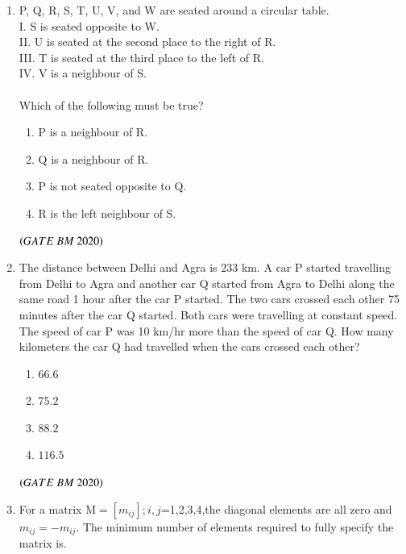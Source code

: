 \documentclass[journal,12pt,onecolumn]{IEEEtran}
\theoremstyle{remark}
\begin{document}
\begin{enumerate}
\item P, Q, R, S, T, U, V, and W are seated around a circular table.\\
      I. S is seated opposite to W.\\
      II. U is seated at the second place to the right of R.\\
      III. T is seated at the third place to the left of R.\\
      IV. V is a neighbour of S.\\
  \\Which of the following must be true?
\begin{enumerate}
    \item \hspace{0.5cm}P is a neighbour of R.
    \item \hspace{0.5cm}Q is a neighbour of R.
    \item \hspace{0.5cm}P is not seated opposite to Q.
    \item \hspace{0.5cm}R is the left neighbour of S.\\
    \end{enumerate}
\hfill $\left(GATE\ BM\ 2020\right)$

\item The distance between Delhi and Agra is 233 km. A car P started travelling from Delhi to Agra and another car Q started from Agra to Delhi along the same road 1 hour after the car P started. The two cars crossed each other 75 minutes after the car Q started. Both cars were travelling at constant speed. The speed of car P was 10 km/hr more than the speed of car Q. How many kilometers the car Q had travelled when the cars crossed each other?
\begin{enumerate}
    \item \hspace{0.5cm}$66.6$
    \item \hspace{0.5cm}$75.2$
    \item \hspace{0.5cm}$88.2$
    \item \hspace{0.5cm}$116.5$\\
    \end{enumerate}
\hfill $\left(GATE\ BM\ 2020\right)$

\item  For a matrix M$=$${[m_{ij}]}$$;i,j$=1,2,3,4,the diagonal elements are all zero and ${m_{ij}}=-$${m_{ij}}$. The minimum number of elements required to fully specify the matrix is\underline{\hspace{2cm}}.


\end{enumerate}
\end{document}
